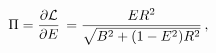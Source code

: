 \begin{equation}
  \Pi= \frac{\partial {\cal L}}{\partial
  E}\,=\frac{E R^2}{\sqrt{B^2+(1-E^2) R^2}}\,,
 \label{valuePi}
\end{equation}

